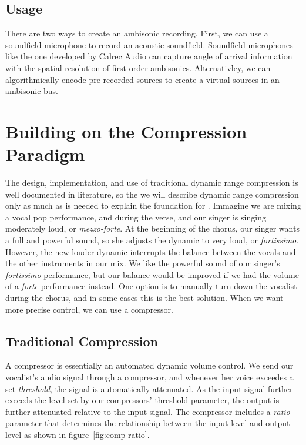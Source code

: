 \subsection{Usage}
\label{sec:usage}
There are two ways to create an ambisonic recording. First, we can use
a soundfield microphone to record an acoustic soundfield. Soundfield
microphones like the one developed by Calrec Audio can capture angle
of arrival information with the spatial resolution of first order
ambisonics.\cite[-1in]{Ferrar1979} Alternativley, we can algorithmically
encode pre-recorded sources to create a virtual sources in an
ambisonic bus.\cite[-0.4in]{Malham1995}

\section{Building on the Compression Paradigm}
  The design, implementation, and use of traditional
dynamic range compression is well documented in
literature,\cite[7mm]{Giannoulis2012,Case2007,Deruty2014} so the we will
describe dynamic range compression only as much as is needed to
explain the foundation for \thesis. Immagine we are
mixing a vocal pop performance, and during the verse, and our singer
is singing moderately loud, or \textit{mezzo-forte}. At the beginning
of the chorus, our singer wants a full and powerful sound, so she
adjusts the dynamic to very loud, or \textit{fortissimo}. However, the
new louder dynamic interrupts the balance between the vocals and the
other instruments in our mix. We like the powerful sound of our
singer's \textit{fortissimo} performance, but our balance would be improved
if we had the volume of a \textit{forte} performance instead. One option is to
manually turn down the vocalist during the chorus, and in some cases
this is the best solution. When we want more precise control, we can
use a compressor.

\subsection{Traditional Compression}
\label{sec:trad-compr}
A compressor is essentially an automated dynamic volume control. We
send our vocalist's audio signal through a compressor, and whenever
her voice exceedes a set \textit{threshold}, the signal is
automatically attenuated. As the input signal further exceeds the
level set by our compressors' threshold parameter, the output is
further attenuated relative to the input signal. The compressor
includes a \textit{ratio} parameter that determines the relationship
between the input level and output level as shown in
figure~\ref{fig:comp-ratio}.

